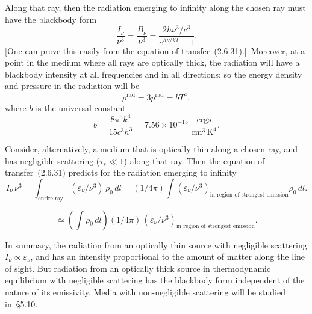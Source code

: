 \medskip
\noindent
Along that ray, then the radiation emerging to infinity along the chosen ray must
have the blackbody form
%
\begin{equation}
\tag{2.6.34}
\frac{I_\nu}{\nu^3} = \frac{B_\nu}{\nu^3}
= \frac{2h\nu^3/c^3}{e^{h\nu/kT} - 1}.
\end{equation}
%
[One can prove this easily from the equation of transfer~(2.6.31).]\
Moreover, at a point in the medium where all rays are optically thick, the
radiation will have a blackbody intensity at all frequencies and in all
directions; so the energy density and pressure in the radiation will be
%
\begin{equation}
\tag{2.6.35}
\rho^{\text{rad}} = 3p^{\text{rad}} = bT^4,
\end{equation}
%
where $b$ is the universal constant
%
\begin{equation}
\tag{2.6.36}
b = \frac{8\pi^5 k^4}{15c^3 h^3}
  = 7.56 \times 10^{-15}\;\frac{\text{ergs}}{\text{cm}^3\,\text{K}^4}.
\end{equation}

Consider, alternatively, a medium that is optically thin along a chosen ray,
and has negligible scattering ($\tau_s \ll 1$) along that ray.  Then the
equation of transfer~(2.6.31) predicts for the radiation emerging to infinity
%
\begin{equation}
\tag{2.6.37}
I_\nu\,\nu^3 = \int_{\text{entire ray}} (\varepsilon_\nu/\nu^3)\,\rho_0\,dl
= (1/4\pi)\int (\varepsilon_\nu/\nu^3)_{\text{in region of strongest emission}}
  \rho_0\,dl.
\end{equation}

\begin{equation}
\tag{2.6.38}
\simeq \left(\int \rho_0\,dl\right)\!(1/4\pi)\,
(\varepsilon_\nu/\nu^3)_{\text{in region of strongest emission}}.
\end{equation}

In summary, the radiation from an optically thin source with negligible
scattering $I_\nu \propto \varepsilon_\nu$, and has an intensity proportional
to the amount of matter along the line of sight.  But radiation from an
optically thick source in thermodynamic equilibrium with negligible scattering
has the blackbody form independent of the nature of its emissivity.  Media with
non-negligible scattering will be studied in~\S5.10.


